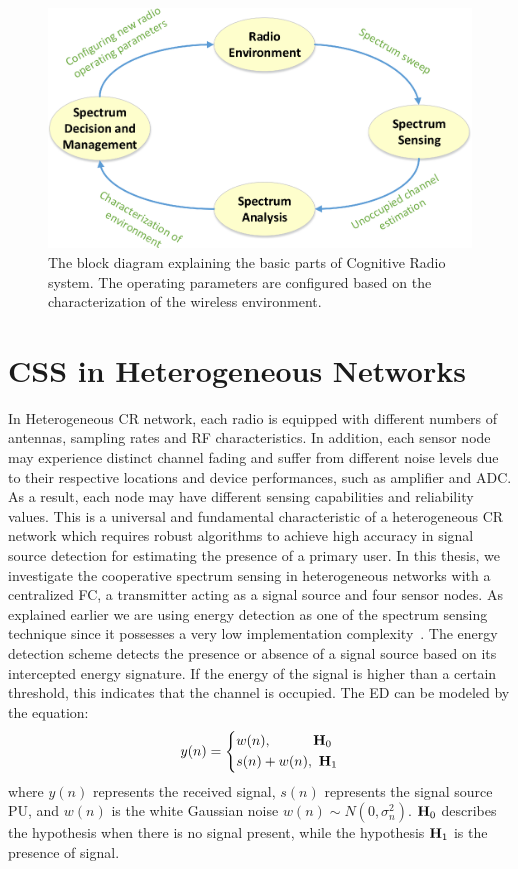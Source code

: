 \begin{figure}[ht!]
	\centering
	\includegraphics[width=\textwidth,keepaspectratio]{images/Gill/figs/cognitive_radio.eps}
    \caption{The block diagram explaining the basic parts of Cognitive Radio system. The operating parameters are configured based on the characterization of the wireless environment.} 
\label{cograd}      
\end{figure}

\section{CSS in Heterogeneous Networks}
In Heterogeneous CR network, each radio is equipped with different numbers of antennas, sampling rates and RF characteristics. In addition, each sensor node may experience distinct channel fading and suffer from different noise levels due to their respective locations and device performances, such as amplifier and ADC.  As a result, each node may have different sensing capabilities and reliability values. This is a universal and fundamental characteristic of a heterogeneous CR network which requires robust algorithms to achieve high accuracy in signal source detection for estimating the presence of a primary user\cite{arhtn13}. In this thesis, we investigate the cooperative spectrum sensing in heterogeneous networks with a centralized FC, a transmitter acting as a signal source and four sensor nodes. As explained earlier we are using energy detection as one of the spectrum sensing technique since it possesses a very low implementation complexity~\cite{arhtn4}. The energy detection scheme detects the presence or absence of a signal source based on its intercepted energy signature. If the energy of the signal is higher than a certain threshold, this indicates that the channel is occupied. The ED can be modeled by the equation:
\begin{equation}
	\label{eq:1}
     y(n) = 
     \left\{
     \begin{aligned}
   &w(n),~~~~~~~~~\mathbf{H}_0\\
   &s(n) + w(n),~\mathbf{H}_1
    \end{aligned}
    \right.
\end{equation}
where $y(n)$ represents the received signal, $s(n)$ represents the signal source PU, and $w(n)$ is the white Gaussian noise $w(n) \sim N(0,\sigma_n^2) $. $\mathbf{H}_0$ describes the hypothesis when there is no signal present, while the hypothesis $\mathbf{H}_1$ is the presence of signal.

